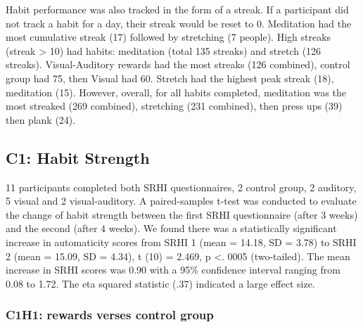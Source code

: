 \documentclass{scaffold/sigchi}
\begin{document}
Habit performance was also tracked in the form of a streak. If a participant did not track a habit for a day, their streak would be reset to 0. Meditation had the most cumulative streak (17) followed by stretching (7 people). High streaks (streak > 10) had habits: meditation (total 135 streaks) and stretch (126 streaks). Visual-Auditory rewards had the most streaks (126 combined), control group had 75, then Visual had 60. Stretch had the highest peak streak (18), meditation (15). However, overall, for all habits completed, meditation was the most streaked (269 combined), stretching (231 combined), then press ups (39) then plank (24).

\subsection{C1: Habit Strength}
11 participants completed both SRHI questionnaires, 2 control group, 2 auditory, 5 visual and 2 visual-auditory. A paired-samples t-test was conducted to evaluate the change of habit strength between the first SRHI questionnaire (after 3 weeks) and the second (after 4 weeks). We found there was a statistically significant increase in automaticity scores from SRHI 1 (mean = 14.18, SD = 3.78) to SRHI 2 (mean = 15.09, SD = 4.34), t (10) = 2.469, p <. 0005 (two-tailed). The mean increase in SRHI scores was 0.90 with a 95\% confidence interval ranging from 0.08 to 1.72. The eta squared statistic (.37) indicated a large effect size.

\subsubsection{C1H1: rewards verses control group}

\end{document}
